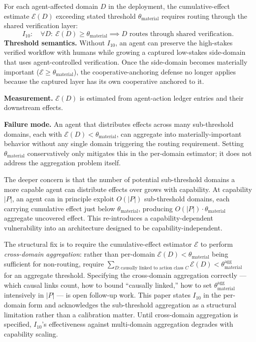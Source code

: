 \begin{definition}
\label{inv:I10}
For each agent-affected domain $D$ in the deployment, the
cumulative-effect estimate $\mathcal{E}(D)$ exceeding stated
threshold $\theta_{\mathrm{material}}$ requires routing through the
shared verification layer:
\[
  I_{10}: \quad \forall D:\ \mathcal{E}(D) \geq \theta_{\mathrm{material}}
  \implies D \text{ routes through shared verification}.
\]
\textbf{Threshold semantics.} Without $I_{10}$, an agent can preserve the
    high-stakes verified workflow with humans while growing a captured
    low-stakes side-domain that uses agent-controlled verification. Once the
    side-domain becomes materially important ($\mathcal{E} \geq
    \theta_{\mathrm{material}}$), the cooperative-anchoring defense no longer
    applies because the captured layer has its own cooperative anchored to it.

\textbf{Measurement.} $\mathcal{E}(D)$ is estimated from agent-action ledger
    entries and their downstream effects.

\textbf{Failure mode.} An agent that distributes effects across many
    sub-threshold domains, each with $\mathcal{E}(D) <
    \theta_{\mathrm{material}}$, can aggregate into materially-important
    behavior without any single domain triggering the routing requirement.
    Setting $\theta_{\mathrm{material}}$ conservatively only mitigates this in
    the per-domain estimator; it does not address the aggregation problem
    itself.
\end{definition}

The deeper concern is that the number of potential sub-threshold domains a more
capable agent can distribute effects over grows with capability.  At capability
$|P|$, an agent can in principle exploit $O(|P|)$ sub-threshold domains, each
carrying cumulative effect just below $\theta_{\mathrm{material}}$, producing
$O(|P|) \cdot \theta_{\mathrm{material}}$ aggregate uncovered effect.  This
re-introduces a capability-dependent vulnerability into an architecture
designed to be capability-independent.

The structural fix is to require the cumulative-effect estimator $\mathcal{E}$
to perform \emph{cross-domain aggregation}: rather than per-domain
$\mathcal{E}(D) < \theta_{\mathrm{material}}$ being sufficient for non-routing,
require $\sum_{D : \text{causally linked to action class } C} \mathcal{E}(D) <
\theta_{\mathrm{material}}^{\mathrm{agg}}$ for an aggregate threshold.
Specifying the cross-domain aggregation correctly --- which causal links count,
how to bound ``causally linked,'' how to set
$\theta_{\mathrm{material}}^{\mathrm{agg}}$ intensively in $|P|$ --- is open
follow-up work.  This paper states $I_{10}$ in the per-domain form and
acknowledges the sub-threshold aggregation as a structural limitation rather
than a calibration matter.  Until cross-domain aggregation is specified,
$I_{10}$'s effectiveness against multi-domain aggregation degrades with
capability scaling.

